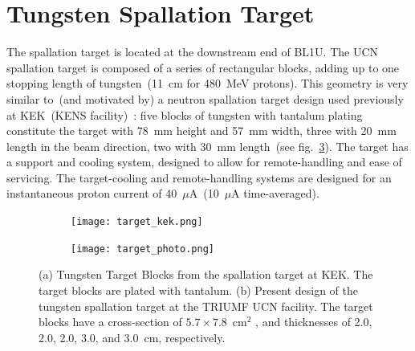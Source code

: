 \section{Tungsten Spallation Target\label{sec:target}}
The spallation target is located at the downstream end of BL1U. The
UCN spallation target is composed of a series of rectangular blocks,
adding up to one stopping length of tungsten~(11~cm for 480~MeV
protons). This geometry is very similar to~(and motivated by) a
neutron spallation target design used previously at KEK~(KENS
facility)~\cite{kawai2001fabrication}: five blocks of tungsten with
tantalum plating constitute the target with 78~mm height and 57~mm
width, three with 20~mm length in the beam direction, two with 30~mm
length~(see fig.~\ref{fig:target}). The target has a support and
cooling system, designed to allow for remote-handling and ease of
servicing. The target-cooling and remote-handling systems are designed
for an instantaneous proton current of 40~$\mu$A~(10~$\mu$A
time-averaged).

\begin{figure}[h!]
  \centering
  \begin{subfigure}{.5\textwidth}
    \centering
    \texttt{[image: target\_kek.png]}
    \caption{}
    \label{fig:target_kek}
  \end{subfigure}%
  \begin{subfigure}{.5\textwidth}
    \centering
    \texttt{[image: target\_photo.png]}
    \caption{}
    \label{fig:target_photo}
  \end{subfigure}
  \caption[TUCAN's spallation target]{(a) Tungsten Target Blocks from
    the spallation target at KEK. The target blocks are plated with
    tantalum. (b) Present design of the tungsten spallation target at
    the TRIUMF UCN facility. The target blocks have a cross-section of
    $5.7 \times 7.8$~cm$^2$ , and thicknesses of 2.0, 2.0, 2.0, 3.0,
    and 3.0~cm, respectively.}
  \label{fig:target}
\end{figure}


